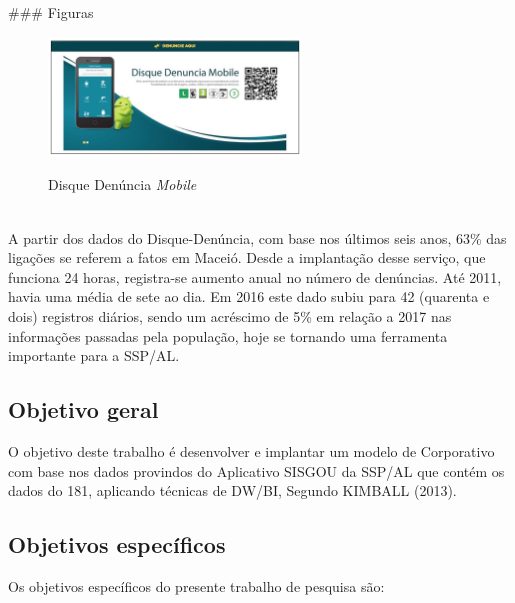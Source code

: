 ### Figuras
\begin{figure}[H]
	\vspace*{0,2cm}
    \centering
    \caption{Disque Denúncia \textit{Mobile}}
    \includegraphics[width=0.6\textwidth]{./04-figuras/figura-disque-denuncia}
    \label{fig:ilustfigdisquedenuncia}
\end{figure}
\vspace*{-0,9cm}
{\raggedright {}} \\

A partir dos dados do Disque-Denúncia, com base nos últimos seis anos, 63\% das liga\c{c}ões se referem a fatos em Maceió. Desde a implanta\c{c}\~{a}o desse servi\c{c}o, que funciona 24 horas, registra-se aumento anual no número de denúncias. At\'{e} 2011, havia uma m\'{e}dia de sete ao dia. Em 2016 este dado subiu para 42 (quarenta e dois) registros di\'{a}rios, sendo um acr\'{e}scimo de 5\% em rela\c{c}\~{a}o a 2017 nas informa\c{c}ões passadas pela popula\c{c}\~{a}o, hoje se tornando uma ferramenta importante para a SSP/AL.

\subsection{Objetivo geral}

O objetivo deste trabalho é desenvolver e implantar um modelo de  Corporativo com base nos dados provindos do Aplicativo SISGOU da SSP/AL que cont\'{e}m os dados do 181, aplicando t\'{e}cnicas de DW/BI, Segundo KIMBALL (2013)\cite{dw-kimball-2013}.

\subsection{Objetivos específicos}

Os objetivos específicos do presente trabalho de pesquisa s\~{a}o:


